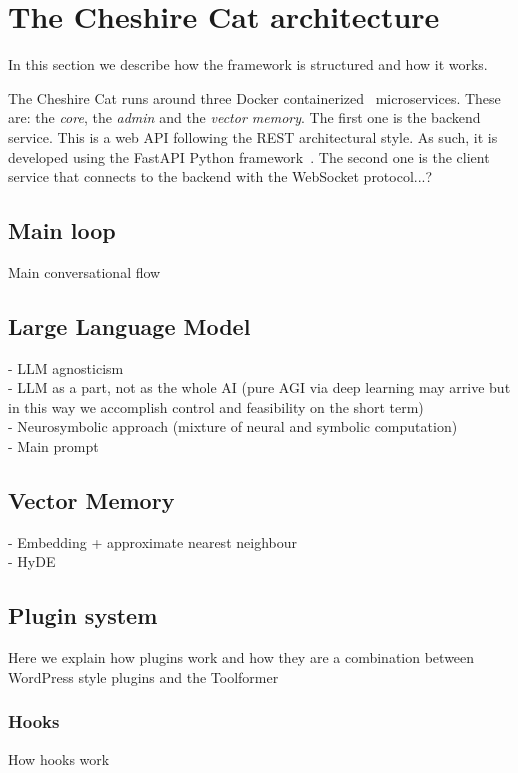 \documentclass{article}
\begin{document}
\section{The Cheshire Cat architecture}

In this section we describe how the framework is structured and how it works.

The Cheshire Cat runs around three Docker containerized~\cite{merkel2014docker} microservices.
These are: the \emph{core}, the \emph{admin} and the \emph{vector memory}.
The first one is the backend service.
This is a web API following the REST architectural style.
As such, it is developed using the FastAPI Python framework~\cite{lathkar2023introduction}.
The second one is the client service that connects to the backend with the WebSocket protocol...?


\subsection{Main loop}
Main conversational flow

\subsection{Large Language Model}
- LLM agnosticism\\
- LLM as a part, not as the whole AI (pure AGI via deep learning may arrive but in this way we accomplish control and feasibility on the short term)\\
- Neurosymbolic approach (mixture of neural and symbolic computation)\\
- Main prompt

\subsection{Vector Memory}
- Embedding + approximate nearest neighbour\\
- HyDE

\subsection{Plugin system}
Here we explain how plugins work and how they are a combination between WordPress style plugins and the Toolformer

\subsubsection{Hooks}
How hooks work
\end{document}
